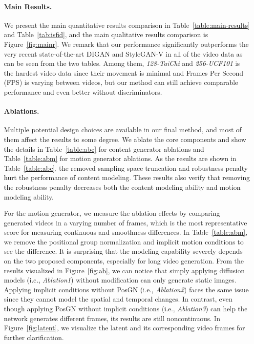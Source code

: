 \documentclass[letterpaper]{article}
\begin{document}
\paragraph{Main Results.}
We present the main quantitative results comparison in Table~\ref{table:main-results} and Table~\ref{tab:isfid}, and the main qualitative results comparison is Figure~\ref{fig:mainr}. We remark that our performance significantly outperforms the very recent state-of-the-art DIGAN and StyleGAN-V in all of the video data as can be seen from the two tables. Among them, \emph{128-TaiChi} and \emph{256-UCF101} is the hardest video data since their movement is minimal and Frames Per Second (FPS) is varying between videos, but our method can still achieve comparable performance and even better without discriminators. 


\paragraph{Ablations.}
Multiple potential design choices are available in our final method, and most of them affect the results to some degree.
We ablate the core components and show the details in Table~\ref{table:abc} for content generator ablations and Table~\ref{table:abm} for motion generator ablations.
As the results are shown in Table~\ref{table:abc}, the removed sampling space truncation and robustness penalty hurt the performance of content modeling.
These results also verify that removing the robustness penalty decreases both the content modeling ability and motion modeling ability.

For the motion generator, we measure the ablation effects by comparing generated videos in a varying number of frames, which is the most representative score for measuring continuous and smoothness differences.
In Table~\ref{table:abm}, we remove the positional group normalization and implicit motion conditions to see the difference. It is surprising that the modeling capability severely depends on the two proposed components, especially for long video generation.
From the results visualized in Figure~\ref{fig:ab}, we can notice that simply applying diffusion models (i.e., \emph{Ablation1}) without modification can only generate static images. Applying implicit conditions without PosGN (i.e., \emph{Ablation2}) faces the same issue since they cannot model the spatial and temporal changes. In contrast, even though applying PosGN without implicit conditions (i.e., \emph{Ablation3}) can help the network generates different frames, its results are still noncontinuous.
In Figure~\ref{fig:latent}, we visualize the latent and its corresponding video frames for further clarification.
\end{document}
